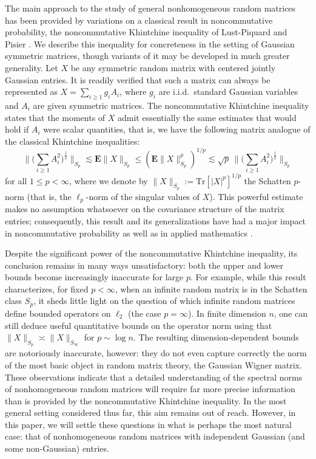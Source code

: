\documentclass[10pt,reqno]{amsart}
\theoremstyle{definition}
\numberwithin{equation}{section}
\numberwithin{figure}{section}
\numberwithin{table}{section}
\begin{document}
The main approach to the study of general nonhomogeneous random matrices 
has been provided by variations on a classical result in noncommutative 
probability, the noncommutative Khintchine inequality of Lust-Piquard and 
Pisier \cite[section 6]{PX03}. We describe this inequality for 
concreteness in the setting of Gaussian symmetric matrices, though 
variants of it may be developed in much greater generality. Let $X$ be any 
symmetric random matrix with centered jointly Gaussian entries. It is 
readily verified that such a matrix can always be represented as 
$X=\sum_{i\ge 1}g_iA_i$, where $g_i$ are i.i.d.\ standard Gaussian 
variables and $A_i$ are given symmetric matrices. The noncommutative 
Khintchine inequality states that the moments of $X$ admit 
essentially the same estimates that would hold if $A_i$ were scalar 
quantities, that is, we have the following matrix analogue of the 
classical Khintchine inequalities:
$$
	\Bigg\|\Bigg(\sum_{i\ge 1}A_i^2\Bigg)^{\frac{1}{2}}\Bigg\|_{S_{p}} 
	\lesssim
	\mathbf{E}\|X\|_{S_p} \le
	(\mathbf{E}\|X\|_{S_p}^p)^{1/p} \lesssim
	\sqrt{p}\,
	\Bigg\|\Bigg(\sum_{i\ge 1}A_i^2\Bigg)^{\frac{1}{2}}\Bigg\|_{S_{p}}
$$
for all $1\le p<\infty$, where we denote by 
$\|X\|_{S_p}:=\mathrm{Tr}[|X|^p]^{1/p}$ the Schatten $p$-norm (that is, 
the $\ell_p$-norm of the singular values of $X$). This powerful estimate 
makes no assumption whatsoever on the covariance structure of the matrix 
entries; consequently, this result and its generalizations have 
had a major impact in noncommutative probability \cite{PX03} as well as in 
applied mathematics \cite{Tro15}.

Despite the significant power of the noncommutative Khintchine inequality, 
its conclusion remains in many ways unsatisfactory: both the upper and 
lower bounds become increasingly inaccurate for large $p$. For example, 
while this result characterizes, for fixed $p<\infty$, when an infinite 
random matrix is in the Schatten class $S_p$, it sheds little light on the 
question of which infinite random matrices define bounded operators on 
$\ell_2$ (the case $p=\infty$). In finite dimension $n$, one can still 
deduce useful quantitative bounds on the operator norm using that 
$\|X\|_{S_p}\asymp\|X\|_{S_{\infty}}$ for $p\sim\log n$. The resulting 
dimension-dependent bounds are notoriously inaccurate, however: they do 
not even capture correctly the norm of the most basic object in random 
matrix theory, the Gaussian Wigner matrix. These observations indicate 
that a detailed understanding of the spectral norms of nonhomogeneous 
random matrices will require far more precise information than is provided 
by the noncommutative Khintchine inequality. In the most general setting 
considered thus far, this aim remains out of reach. However, in 
this paper, we will settle these questions in what is perhaps the most 
natural case: that of nonhomogeneous random matrices with 
independent Gaussian (and some non-Gaussian) entries.
\end{document}
